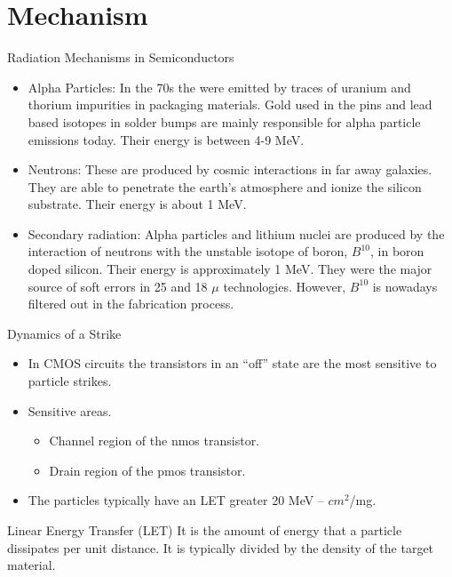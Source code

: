 \documentclass{beamer}
\begin{document}
\section{Mechanism}
\begin{frame}[shrink=5]{Radiation Mechanisms in Semiconductors}
 \begin{itemize}
  \item {\color{blue} Alpha Particles:} In the 70s the were emitted by traces of uranium and thorium impurities in packaging materials. Gold used in the pins 
and lead based isotopes in solder bumps are mainly responsible for alpha particle emissions today. Their energy is between 4-9 MeV. 
  \item {\color{blue} Neutrons: } These are produced by cosmic interactions in far away galaxies. They are able to penetrate the earth's atmosphere and ionize
  the silicon substrate. Their energy is about 1 MeV. 
  \item {\color{blue} Secondary radiation:} Alpha particles and lithium nuclei are produced by the interaction of neutrons with the unstable isotope of boron, 
$B^{10}$, in boron doped silicon. Their
energy is approximately 1 MeV. They were the major source of soft errors in 25 and 18 $\mu$ technologies. However, $B^{10}$
is nowadays filtered out in the fabrication process.
 \end{itemize}
\end{frame}

\begin{frame} {Dynamics of a Strike}
 \begin{itemize}
  \item In CMOS circuits the transistors in an ``off'' state are the most sensitive to particle strikes.
    \item Sensitive areas.
      \begin{itemize}
	\item Channel region of the nmos transistor.
	\item Drain region of the pmos transistor.
      \end{itemize}

  \item The particles typically have an LET greater 20 MeV -- $cm^2$/mg. 
 \end{itemize}
\begin{definition} {Linear Energy Transfer (LET)}
 It is the amount of energy that a particle dissipates per unit distance. It is typically divided by the 
density of the target material.
\end{definition}
\end{frame}
\end{document}
